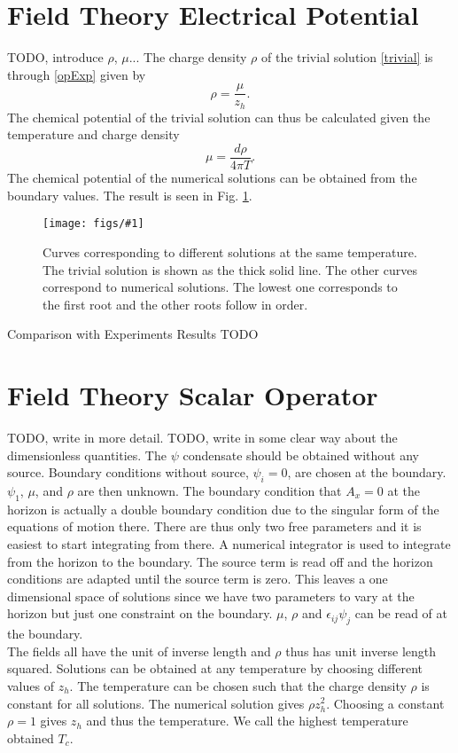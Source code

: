\documentclass[12pt]{report}
\newcommand{\At}{\ensuremath{{A_x}}}
\newcommand{\fig}[3]{
\begin{figure}
\centering
\texttt{[image: figs/\#1]}
\caption{#2}
\end{figure}
}
\begin{document}
\section{Field Theory Electrical Potential}
TODO, introduce $\rho$, $\mu$...
The charge density $\rho$ of the trivial solution \eqref{trivial} is through \eqref{opExp} given by
\begin{equation}
 \rho=\frac{\mu}{z_h}.
\end{equation}
The chemical potential of the trivial solution can thus be calculated given the temperature and charge density
\begin{equation}
 \mu=\frac{d\rho}{4\pi T}.
\end{equation}
The chemical potential of the numerical solutions can be obtained from the boundary values. The result is seen in Fig. \ref{f:mu}.

\fig{muTzeros}{Curves corresponding to different solutions at the same temperature. The trivial solution is shown as the thick solid line. The other curves correspond to numerical solutions. The lowest one corresponds to the first root and the other roots follow in order.\label{f:mu}}
\subsection{Comparison with Experiments Results}
TODO
\section{Field Theory Scalar Operator}
TODO, write in more detail. TODO, write in some clear way about the dimensionless quantities.
The $\psi$ condensate should be obtained without any source. Boundary conditions without source, $\psi_i=0$, are chosen at the boundary. $\psi_1$, $\mu$, and $\rho$ are then unknown. The boundary condition that $\At=0$ at the horizon is actually a double boundary condition due to the singular form of the equations of motion there. There are thus only two free parameters and it is easiest to start integrating from there. A numerical integrator is used to integrate from the horizon to the boundary. The source term is read off and the horizon conditions are adapted until the source term is zero. This leaves a one dimensional space of solutions since we have two parameters to vary at the horizon but just one constraint on the boundary. $\mu$, $\rho$ and $\epsilon_{ij}\psi_j$ can be read of at the boundary.\\

The fields all have the unit of inverse length and $\rho$ thus has unit inverse length squared. Solutions can be obtained at any temperature by choosing different values of $z_h$. The temperature can be chosen such that the charge density $\rho$ is constant for all solutions. The numerical solution gives $\rho z_h^2$. Choosing a constant $\rho=1$ gives $z_h$ and thus the temperature. We call the highest temperature obtained $T_c$.
\end{document}
